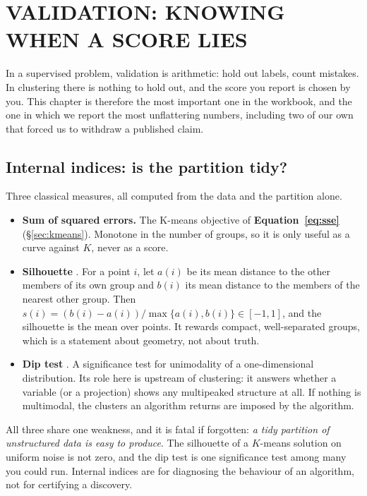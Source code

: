 \section{VALIDATION: KNOWING WHEN A SCORE LIES}
\label{sec:validation}


In a supervised problem, validation is arithmetic: hold out labels, count
mistakes. In clustering there is nothing to hold out, and the score you report
is chosen by you. This chapter is therefore the most important one in the
workbook, and the one in which we report the most unflattering numbers,
including two of our own that forced us to withdraw a published claim.

\subsection{Internal indices: is the partition tidy?}

Three classical measures, all computed from the data and the partition alone.

\begin{itemize}
\item \textbf{Sum of squared errors.} The K-means objective of
  \textbf{Equation~\ref{eq:sse}} (\S\ref{sec:kmeans}).
  Monotone in the number of groups, so it is only useful as a curve against
  $K$, never as a score.
\item \textbf{Silhouette} \citep{Rousseeuw:87}. For a point $i$, let $a(i)$ be
its mean distance to the other members of its own group and $b(i)$ its mean
distance to the members of the nearest other group. Then $s(i) =
(b(i)-a(i))/\max\{a(i),b(i)\} \in [-1,1]$, and the silhouette is the mean over
points. It rewards compact, well-separated groups, which is a statement about
geometry, not about truth.
\item \textbf{Dip test} \citep{Hartigan:85}. A significance test for
  unimodality of a one-dimensional distribution. Its role here is upstream of
  clustering: it answers whether a variable (or a projection) shows any
  multipeaked structure at all. If nothing is multimodal, the clusters an
  algorithm returns are imposed by the algorithm.
\end{itemize}

All three share one weakness, and it is fatal if forgotten: \emph{a tidy
partition of unstructured data is easy to produce}. The silhouette of a
$K$-means solution on uniform noise is not zero, and the dip test is one
significance test among many you could run. Internal indices are for
diagnosing the behaviour of an algorithm, not for certifying a discovery.

